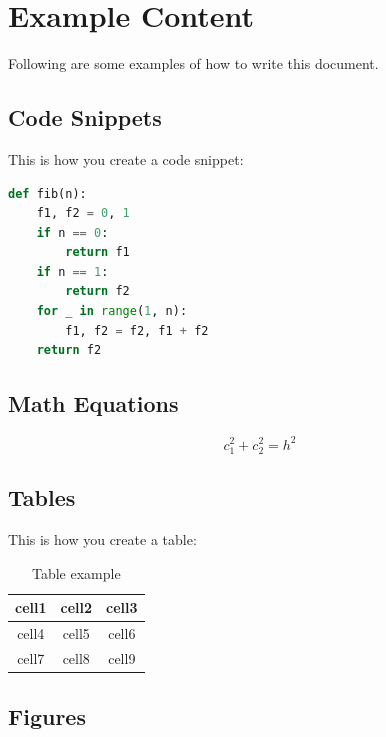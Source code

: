 \section{Example Content}
\label{sec:examplecontent}

Following are some examples of how to write this document.

\subsection{Code Snippets}
\label{subsec:codesnippets}

This is how you create a code snippet:

\begin{lstlisting}[language=Python, caption=Code example]
  def fib(n):
    f1, f2 = 0, 1
    if n == 0:
        return f1
    if n == 1:
        return f2
    for _ in range(1, n):
        f1, f2 = f2, f1 + f2
    return f2
\end{lstlisting}

\subsection{Math Equations}
\label{subsec:mathequations}

\begin{equation}
  \label{eq:equationexample}
  c_1^2 + c_2^2 = h^2
\end{equation}

\subsection{Tables}
\label{subsec:tables}

This is how you create a table:

\begin{table}[h]
  \begin{center}
    \begin{tabular}{ |c|c|c| }
      \hline
      cell1 & cell2 & cell3 \\
      \hline
      cell4 & cell5 & cell6 \\
      cell7 & cell8 & cell9 \\
      \hline
    \end{tabular}
    \caption{Table example}
    \label{tbl:tableexample}
  \end{center}
\end{table}

\subsection{Figures}
\label{subsec:figures}

